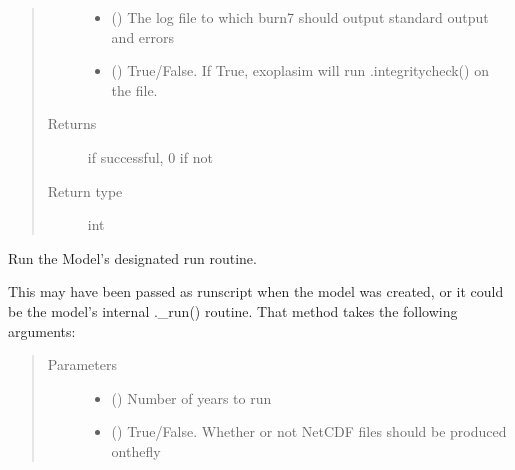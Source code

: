 \documentclass[letterpaper,10pt,english]{sphinxmanual}
\begin{document}
\begin{fulllineitems}
\begin{fulllineitems}
\begin{quote}
\begin{description}
\begin{itemize}
\item {} 
 (\sphinxstyleliteralemphasis{\sphinxupquote{, }}) \textendash{} The log file to which burn7 should output standard output and errors

\item {} 
 (\sphinxstyleliteralemphasis{\sphinxupquote{, }}) \textendash{} True/False. If True, exoplasim will run .integritycheck() on the file.

\end{itemize}

\item[{Returns}]  if successful, 0 if not

\item[{Return type}] \leavevmode
int

\end{description}\end{quote}

\end{fulllineitems}


\begin{fulllineitems}
\label{\detokenize{source/exoplasim:exoplasim.Model.run}}
Run the Model’s designated run routine.

This may have been passed as runscript when the model was
created, or it could be the model’s internal .\_run() routine.
That method takes the following arguments:
\begin{quote}\begin{description}
\item[{Parameters}] \leavevmode\begin{itemize}
\item {} 
 (\sphinxstyleliteralemphasis{\sphinxupquote{, }}) \textendash{} Number of years to run

\item {} 
 (\sphinxstyleliteralemphasis{\sphinxupquote{, }}) \textendash{} True/False. Whether or not NetCDF files should be produced on\sphinxhyphen{}the\sphinxhyphen{}fly


\end{itemize}
\end{description}
\end{quote}
\end{fulllineitems}
\end{fulllineitems}
\end{document}
